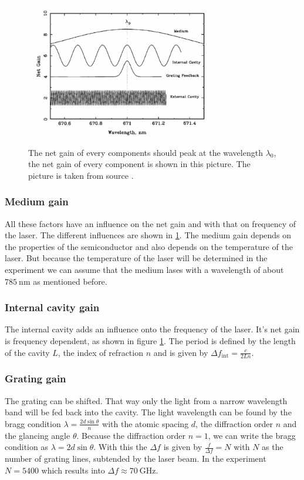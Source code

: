 \begin{figure}
    \centering
    \caption{The net gain of every components should peak at the wavelength $\lambda_0$, the net gain of every component is shown in this picture. The picture is taken from source \cite[6]{anleitung_laser}.}
    \includegraphics[width=0.75\textwidth]{content/data/netgain.png}
    \label{fig:netgain}
\end{figure}
\FloatBarrier
\subsubsection{Medium gain}
All these factors have an influence on the net gain and with that on frequency of the laser.
The different influences are shown in \ref{fig:netgain}.
The medium gain depends on the properties of the semiconductor and also depends on the temperature of the laser.
But because the temperature of the laser will be determined in the experiment we can assume that the medium lases with a wavelength of about $\SI{785}{\nano\meter}$ as mentioned before.

\subsubsection{Internal cavity gain}
The internal cavity adds an influence onto the frequency of the laser.
It's net gain is frequency dependent, as shown in figure \ref{fig:netgain}.
The period is defined by the length of the cavity $L$, the index of refraction $n$ and is given by
$\Delta f_\text{int} = \frac{c}{2Ln}$.

\subsubsection{Grating gain}
The grating can be shifted.
That way only the light from a narrow wavelength band will be fed back into the cavity.
The light wavelength can be found by the bragg condition $\lambda = \frac{2d \sin{\theta}}{n}$ with the atomic spacing $d$, the diffraction order $n$ and the glancing angle $\theta$.
Because the diffraction order $n = 1$, we can write the bragg condition as $\lambda = 2d\sin{\theta}$.
With this the $\Delta f$ is given by $\frac{f}{\Delta f} = N$ with $N$ as the number of grating lines, subtended by the laser beam.
In the experiment $N=5400$ which results into $\Delta f \approx \SI{70}{\giga\Hz}$.

